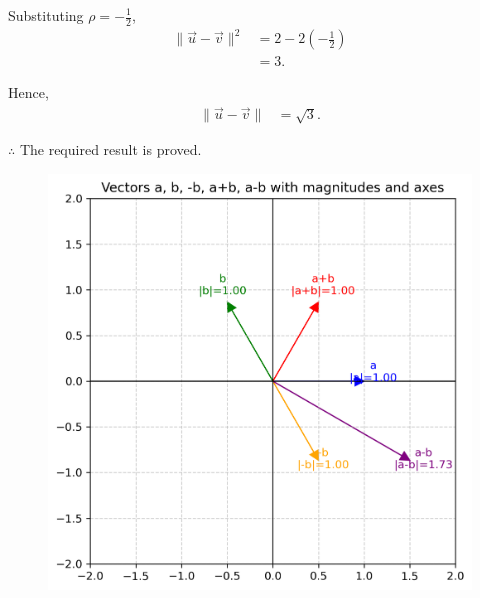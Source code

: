 \documentclass[journal]{IEEEtran}
\begin{document}
Substituting \(\rho = -\tfrac{1}{2}\),
\begin{align}
\|\vec{u}-\vec{v}\|^2 &= 2 - 2\left(-\tfrac{1}{2}\right) \\
&= 3.
\end{align}

Hence,
\begin{align}
\|\vec{u}-\vec{v}\| &= \sqrt{3}.
\end{align}

\noindent\(\therefore\) The required result is proved.
\begin{figure}[H]
  \centering
   \includegraphics[width=0.7\linewidth]{../figs/vectors_plot.png}
   \caption{}
  \label{stemplot}
\end{figure}
\end{document}
